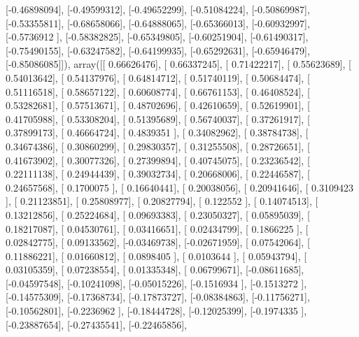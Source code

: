 \documentclass{article}
\begin{document}
       [-0.46898094],
       [-0.49599312],
       [-0.49652299],
       [-0.51084224],
       [-0.50869987],
       [-0.53355811],
       [-0.68658066],
       [-0.64888065],
       [-0.65366013],
       [-0.60932997],
       [-0.5736912 ],
       [-0.58382825],
       [-0.65349805],
       [-0.60251904],
       [-0.61490317],
       [-0.75490155],
       [-0.63247582],
       [-0.64199935],
       [-0.65292631],
       [-0.65946479],
       [-0.85086085]]), array([[ 0.66626476],
       [ 0.66337245],
       [ 0.71422217],
       [ 0.55623689],
       [ 0.54013642],
       [ 0.54137976],
       [ 0.64814712],
       [ 0.51740119],
       [ 0.50684474],
       [ 0.51116518],
       [ 0.58657122],
       [ 0.60608774],
       [ 0.66761153],
       [ 0.46408524],
       [ 0.53282681],
       [ 0.57513671],
       [ 0.48702696],
       [ 0.42610659],
       [ 0.52619901],
       [ 0.41705988],
       [ 0.53308204],
       [ 0.51395689],
       [ 0.56740037],
       [ 0.37261917],
       [ 0.37899173],
       [ 0.46664724],
       [ 0.4839351 ],
       [ 0.34082962],
       [ 0.38784738],
       [ 0.34674386],
       [ 0.30860299],
       [ 0.29830357],
       [ 0.31255508],
       [ 0.28726651],
       [ 0.41673902],
       [ 0.30077326],
       [ 0.27399894],
       [ 0.40745075],
       [ 0.23236542],
       [ 0.22111138],
       [ 0.24944439],
       [ 0.39032734],
       [ 0.20668006],
       [ 0.22446587],
       [ 0.24657568],
       [ 0.1700075 ],
       [ 0.16640441],
       [ 0.20038056],
       [ 0.20941646],
       [ 0.3109423 ],
       [ 0.21123851],
       [ 0.25808977],
       [ 0.20827794],
       [ 0.122552  ],
       [ 0.14074513],
       [ 0.13212856],
       [ 0.25224684],
       [ 0.09693383],
       [ 0.23050327],
       [ 0.05895039],
       [ 0.18217087],
       [ 0.04530761],
       [ 0.03416651],
       [ 0.02434799],
       [ 0.1866225 ],
       [ 0.02842775],
       [ 0.09133562],
       [-0.03469738],
       [-0.02671959],
       [ 0.07542064],
       [ 0.11886221],
       [ 0.01660812],
       [ 0.0898405 ],
       [ 0.0103644 ],
       [ 0.05943794],
       [ 0.03105359],
       [ 0.07238554],
       [ 0.01335348],
       [ 0.06799671],
       [-0.08611685],
       [-0.04597548],
       [-0.10241098],
       [-0.05015226],
       [-0.1516934 ],
       [-0.1513272 ],
       [-0.14575309],
       [-0.17368734],
       [-0.17873727],
       [-0.08384863],
       [-0.11756271],
       [-0.10562801],
       [-0.2236962 ],
       [-0.18444728],
       [-0.12025399],
       [-0.1974335 ],
       [-0.23887654],
       [-0.27435541],
       [-0.22465856],
\end{document}
